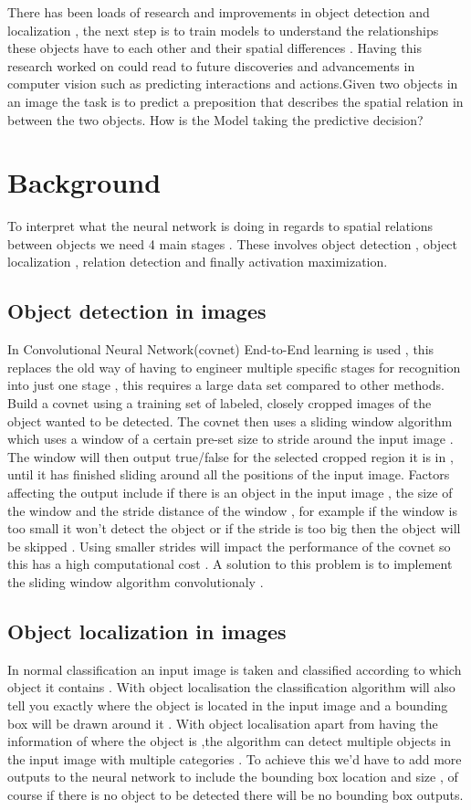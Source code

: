 \documentclass{csfyp}
\begin{document}
There has been loads of research and improvements in object detection and localization , the next step is to train models to understand the relationships these objects have to each other and their spatial differences . Having this research worked on could read to future discoveries and advancements in computer vision such as predicting interactions and actions.Given two objects in an image the task is to predict a preposition that describes the spatial relation in between the two objects. How is the Model taking the predictive decision?

\section{Background}

To interpret what the neural network is doing in regards to spatial relations between objects we need 4 main stages . These involves object detection , object localization , relation detection and finally activation maximization. 

\subsection{Object detection in images}

In Convolutional Neural Network(covnet) End-to-End learning is used , this replaces the old way of having to engineer multiple specific stages for recognition into just one stage , this requires a large data set compared to other methods. Build a covnet using a training set of labeled, closely cropped images of the object wanted to be detected. The covnet then uses a sliding window algorithm which uses a window of a certain pre-set size to stride around the input image . The window will then output true/false for the selected cropped region it is in , until it has finished sliding around all the positions of the input image. Factors affecting the output include if there is an object in the input image , the size of the window and the stride distance of the window , for example if the window is too small it won’t detect the object or if the stride is too big then the object will be skipped . Using smaller strides will impact the performance of the covnet so this has a high computational cost . A solution to this problem is to implement the sliding window algorithm convolutionaly . 

\subsection{Object localization in images}
In normal classification an input image is taken and classified according to which object it contains . With object localisation the classification algorithm will also tell you exactly where the object is located in the input image and a bounding box will be drawn around it . With object localisation apart from having the information of where the object is ,the algorithm can detect multiple objects in the input image with multiple categories . To achieve this we’d have to add more outputs to the neural network to include the bounding box location and size , of course if there is no object to be detected there will be no bounding box outputs.  
\end{document}
